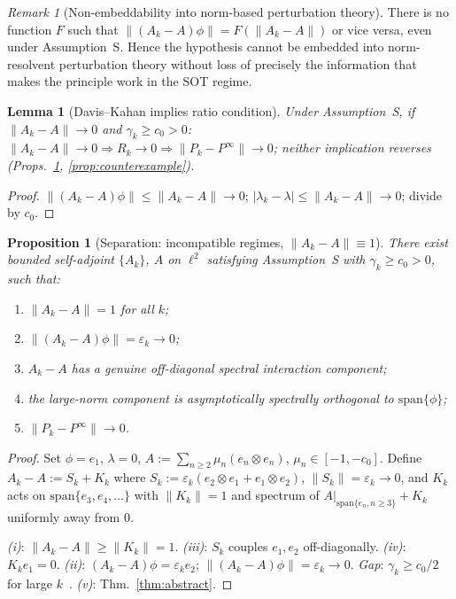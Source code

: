 \documentclass[12pt,a4paper]{amsart}
\newtheorem{lemma}[theorem]{Lemma}
\newtheorem{proposition}[theorem]{Proposition}
\theoremstyle{definition}
\theoremstyle{remark}
\newtheorem{remark}[theorem]{Remark}
\begin{document}
\begin{remark}[Non-embeddability into
  norm-based perturbation theory]
\label{rem:nonreducibility}
There is no function $F$ such that
$\|(A_k-A)\phi\| = F(\|A_k-A\|)$
or vice versa, even under Assumption~S.
Hence the hypothesis cannot be
embedded into norm-resolvent
perturbation theory without loss of
precisely the information that makes
the principle work in the SOT regime.
\end{remark}

\begin{lemma}[Davis--Kahan implies
  ratio condition]
\label{lem:dk-comparison}
Under Assumption~S, if
$\|A_k-A\|\to 0$ and
$\gamma_k\ge c_0>0$:
$\|A_k-A\|\to 0
\Rightarrow R_k\to 0
\Rightarrow\|P_k-P^\infty\|\to 0$;
neither implication reverses
(Props.~\ref{prop:separation},
\ref{prop:counterexample}).
\end{lemma}
\begin{proof}
$\|(A_k-A)\phi\|\le\|A_k-A\|\to 0$;
$|\lambda_k-\lambda|\le\|A_k-A\|\to 0$;
divide by $c_0$.
\end{proof}

\begin{proposition}[Separation:
  incompatible regimes,
  $\|A_k-A\|\equiv 1$]
\label{prop:separation}
There exist bounded self-adjoint
$\{A_k\}$, $A$ on $\ell^2$
satisfying Assumption~S with
$\gamma_k\ge c_0>0$, such that:
\begin{enumerate}[\rm(i)]
\item $\|A_k-A\|=1$ for all $k$;
\item $\|(A_k-A)\phi\|
  =\varepsilon_k\to 0$;
\item $A_k-A$ has a genuine
  off-diagonal spectral interaction
  component;
\item the large-norm component is
  asymptotically spectrally orthogonal
  to $\mathrm{span}\{\phi\}$;
\item $\|P_k-P^\infty\|\to 0$.
\end{enumerate}
\end{proposition}
\begin{proof}
Set $\phi=e_1$, $\lambda=0$,
$A:=\sum_{n\ge 2}\mu_n(e_n\otimes e_n)$,
$\mu_n\in[-1,-c_0]$.
Define $A_k-A:=S_k+K_k$ where
$S_k:=\varepsilon_k
(e_2\otimes e_1+e_1\otimes e_2)$,
$\|S_k\|=\varepsilon_k\to 0$,
and $K_k$ acts on
$\mathrm{span}\{e_3,e_4,\ldots\}$
with $\|K_k\|=1$ and spectrum of
$A|_{\mathrm{span}\{e_n,n\ge 3\}}+K_k$
uniformly away from $0$.

\textit{(i)}: $\|A_k-A\|\ge\|K_k\|=1$.
\textit{(iii)}: $S_k$ couples
$e_1,e_2$ off-diagonally.
\textit{(iv)}: $K_ke_1=0$.
\textit{(ii)}: $(A_k-A)\phi
=\varepsilon_k e_2$;
$\|(A_k-A)\phi\|=\varepsilon_k\to 0$.
\textit{Gap}: $\gamma_k\ge c_0/2$
for large $k$~\cite[Ch.~II]{Kato1966}.
\textit{(v)}: Thm.~\ref{thm:abstract}.
\end{proof}
\end{document}

